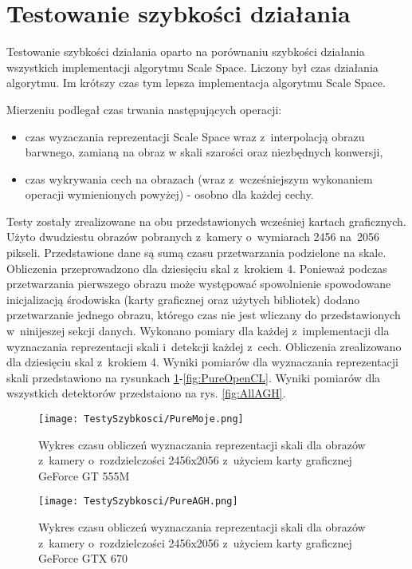 \section{Testowanie szybkości działania}
\label{sec:testSzybkosci}

Testowanie szybkości działania oparto na porównaniu szybkości działania wszystkich implementacji algorytmu Scale Space. Liczony był czas działania algorytmu. Im krótszy czas tym lepsza implementacja algorytmu Scale Space.

Mierzeniu podlegał czas trwania następujących operacji:
\begin{itemize}
\item czas wyzaczania reprezentacji Scale Space wraz z~interpolacją obrazu barwnego, zamianą na obraz w skali szarości oraz niezbędnych konwersji,
\item czas wykrywania cech na obrazach (wraz z~wcześniejszym wykonaniem operacji wymienionych powyżej) - osobno dla każdej cechy.
\end{itemize}

Testy zostały zrealizowane na obu przedstawionych wcześniej kartach graficznych. Użyto dwudziestu obrazów pobranych z~kamery o~wymiarach 2456 na~2056 pikseli. Przedstawione dane są sumą czasu przetwarzania podzielone na skale. Obliczenia przeprowadzono dla dziesięciu skal z~krokiem 4. Ponieważ podczas przetwarzania pierwszego obrazu może występować spowolnienie spowodowane inicjalizacją środowiska (karty graficznej oraz użytych bibliotek) dodano przetwarzanie jednego obrazu, którego czas nie jest wliczany do przedstawionych w~ninijeszej sekcji danych. Wykonano pomiary dla każdej z~implementacji dla wyznaczania reprezentacji skali i~detekcji każdej z~cech. Obliczenia zrealizowano dla dziesięciu skal z~krokiem 4. Wyniki pomiarów dla wyznaczania reprezentacji skali przedstawiono na rysunkach \ref{fig:pureSzybkoscMoje}-\ref{fig:PureOpenCL}. Wyniki pomiarów dla wszystkich detektorów przedstaiono na rys. \ref{fig:AllAGH}.

\begin{figure}[h]
\begin{center}
\texttt{[image: TestySzybkosci/PureMoje.png]}
\end{center}
\caption{Wykres czasu obliczeń wyznaczania reprezentacji skali dla obrazów z~kamery o~rozdzielczości 2456x2056 z~użyciem karty graficznej GeForce GT 555M}
\label{fig:pureSzybkoscMoje}
\end{figure}

\begin{figure}[h]
\begin{center}
\texttt{[image: TestySzybkosci/PureAGH.png]}
\end{center}
\caption{Wykres czasu obliczeń wyznaczania reprezentacji skali dla obrazów z~kamery o~rozdzielczości 2456x2056 z~użyciem karty graficznej GeForce GTX 670}
\label{fig:pureSzybkoscAGH}
\end{figure}

